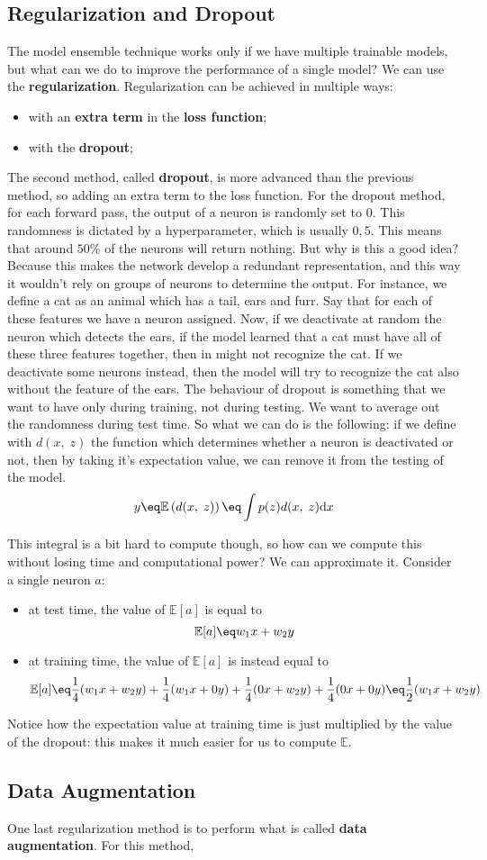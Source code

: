 \subsection{Regularization and Dropout}

The model ensemble technique works only if we have multiple trainable models, but what can we do to improve the performance of a single model? We can use the \textbf{regularization}. Regularization can be achieved in multiple ways:
\begin{itemize}
    \item with an \textbf{extra term} in the \textbf{loss function};
    \item with the \textbf{dropout};
\end{itemize}


The second method, called \textbf{dropout}, is more advanced than the previous method, so adding an extra term to the loss function. For the dropout method, for each forward pass, the output of a neuron is randomly set to 0. This randomness is dictated by a hyperparameter, which is usually $0,5$. This means that around $50\%$ of the neurons will return nothing.
\nwl
But why is this a good idea? Because this makes the network develop a redundant representation, and this way it wouldn't rely on groups of neurons to determine the output. For instance, we define a cat as an animal which has a tail, ears and furr. Say that for each of these features we have a neuron assigned. Now, if we deactivate at random the neuron which detects the ears, if the model learned that a cat must have all of these three features together, then in might not recognize the cat. If we deactivate some neurons instead, then the model will try to recognize the cat also without the feature of the ears.
\nwl
The behaviour of dropout is something that we want to have only during training, not during testing. We want to average out the randomness during test time. So what we can do is the following: if we define with $d(x, \; z)$ the function which determines whether a neuron is deactivated or not, then by taking it's expectation value, we can remove it from the testing of the model.
\[ y \eq \mathbb{E}\left(d(x, \; z)\right) \eq \int p(z) d(x, \; z) \text{d}x \]

This integral is a bit hard to compute though, so how can we compute this without losing time and computational power? We can approximate it. Consider a single neuron $a$:
\begin{itemize}
    \item at test time, the value of $\mathbb{E}[a]$ is equal to
    \[ \mathbb{E}[a] \eq w_1x + w_2y \]
    \item at training time, the value of $\mathbb{E}[a]$ is instead equal to
    \[ \mathbb{E}[a] \eq \frac{1}{4} (w_1x + w_2y) + \frac{1}{4} (w_1x + 0y) + \frac{1}{4} (0x + w_2y) + \frac{1}{4} (0x + 0y) \eq \frac{1}{2} (w_1x + w_2y) \]
\end{itemize}

Notice how the expectation value at training time is just multiplied by the value of the dropout: this makes it much easier for us to compute $\mathbb{E}$.

\subsection{Data Augmentation}

One last regularization method is to perform what is called \textbf{data augmentation}. For this method, 